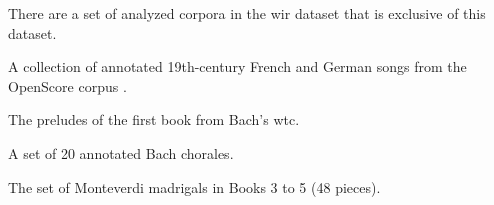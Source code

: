 

There are a set of analyzed corpora in the \gls{wir} dataset
that is exclusive of this dataset.


A collection of annotated 19th-century French and German
songs from the OpenScore corpus
\textcite{gotham2022openscore}.


The preludes of the first book from Bach's \gls{wtc}. 


A set of 20 annotated Bach chorales. 


The set of Monteverdi madrigals in Books 3 to 5 (48 pieces).

